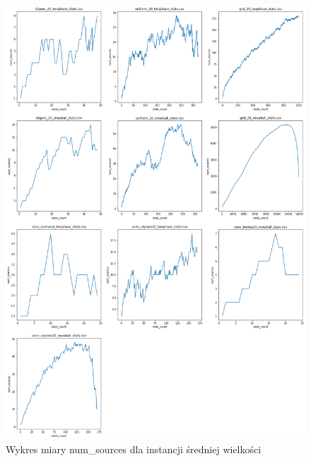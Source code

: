 \begin{figure}[]
    \centering
    \includegraphics[width=\textwidth]{chapters/experiments/img/merged_plots/per1_all/num_sources.png}
    \caption{Wykres miary num\_sources dla instancji średniej wielkości}
    \label{fig:included_num_sources_small}
\end{figure}

